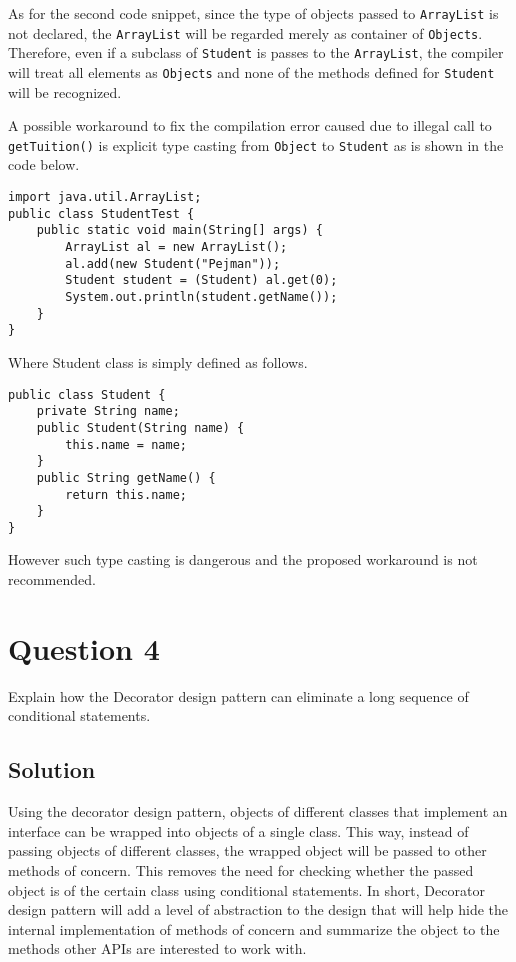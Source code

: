As for the second code snippet, since the type of objects passed to \texttt{ArrayList} is not declared, the \texttt{ArrayList} will be regarded merely as container of \texttt{Objects}.
Therefore, even if a subclass of \texttt{Student} is passes to the \texttt{ArrayList}, the compiler will treat all elements as \texttt{Objects} and none of the methods defined for \texttt{Student} will be recognized.

A possible workaround to fix the compilation error caused due to illegal call to \texttt{getTuition()} is explicit type casting from \texttt{Object} to \texttt{Student} as is shown in the code below.

\begin{lstlisting}
import java.util.ArrayList;
public class StudentTest {
	public static void main(String[] args) {
		ArrayList al = new ArrayList();
		al.add(new Student("Pejman"));
		Student student = (Student) al.get(0);
		System.out.println(student.getName());
	}
}
\end{lstlisting}

Where Student class is simply defined as follows.

\begin{lstlisting}
public class Student {
	private String name;
	public Student(String name) {
		this.name = name;
	}
	public String getName() {
		return this.name;
	}
}
\end{lstlisting}

However such type casting is dangerous and the proposed workaround is not recommended.

\section{Question 4}
Explain how the Decorator design pattern can eliminate a long sequence of conditional statements.

\subsection*{Solution}

Using the decorator design pattern, objects of different classes that implement an interface can be wrapped into objects of a single class.
This way, instead of passing objects of different classes, the wrapped object will be passed to other methods of concern.
This removes the need for checking whether the passed object is of the certain class using conditional statements.
In short, Decorator design pattern will add a level of abstraction to the design that will help hide the internal implementation of methods of concern and summarize the object to the methods other APIs are interested to work with.
